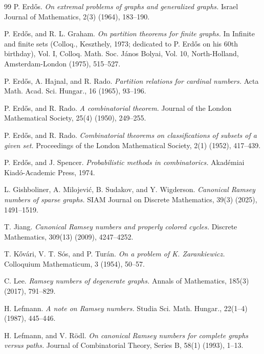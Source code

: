 \documentclass[11pt]{article}
\theoremstyle{plain}
\theoremstyle{definition}
\begin{document}
\begin{thebibliography}{99}
P. Erd{\H{o}}s.
\emph{On extremal problems of graphs and generalized graphs.}
Israel Journal of Mathematics, 2(3) (1964), 183--190.

P. Erd{\H{o}}s, and R. L. Graham.
\emph{On partition theorems for finite graphs.}
In Infinite and finite sets (Colloq., Keszthely, 1973; dedicated to P. Erd{\H{o}}s on his 60th birthday), Vol. I, Colloq. Math. Soc. J{\'a}nos Bolyai, Vol. 10, North-Holland, Amsterdam-London (1975), 515--527.

P. Erd{\H{o}}s, A. Hajnal, and R. Rado.
\emph{Partition relations for cardinal numbers.}
Acta Math. Acad. Sci. Hungar., 16 (1965), 93--196.

P. Erd{\H{o}}s, and R. Rado.
\emph{A combinatorial theorem.}
Journal of the London Mathematical Society, 25(4) (1950), 249--255.

P. Erd\H{o}s, and R. Rado.
\emph{Combinatorial theorems on classifications of subsets of a given set.}
Proceedings of the London Mathematical Society, 2(1) (1952), 417--439.

P. Erd{\H{o}}s, and J. Spencer.
\emph{Probabilistic methods in combinatorics.}
Akad{\'e}miai Kiad{\'o}-Academic Press, 1974.

L. Gishboliner, A. Milojevi{\'c}, B. Sudakov, and Y. Wigderson.
\emph{Canonical Ramsey numbers of sparse graphs.}
SIAM Journal on Discrete Mathematics, 39(3) (2025), 1491--1519.

T. Jiang.
\emph{Canonical Ramsey numbers and properly colored cycles.}
Discrete Mathematics, 309(13) (2009), 4247--4252.

T. K{\H{o}}v{\'a}ri, V. T. S{\'o}s, and P. Tur{\'a}n.
\emph{On a problem of K. Zarankiewicz.}
Colloquium Mathematicum, 3 (1954), 50--57.

C. Lee.
\emph{Ramsey numbers of degenerate graphs.}
Annals of Mathematics, 185(3) (2017), 791--829.

H. Lefmann.
\emph{A note on Ramsey numbers.}
Studia Sci. Math. Hungar., 22(1--4) (1987), 445--446.

H. Lefmann, and V. R{\"o}dl.
\emph{On canonical Ramsey numbers for complete graphs versus paths.}
Journal of Combinatorial Theory, Series B, 58(1) (1993), 1--13.


\end{thebibliography}
\end{document}
